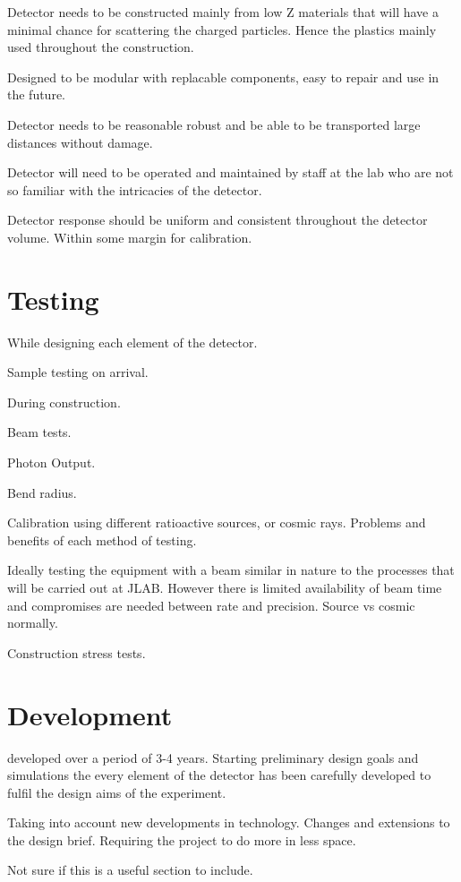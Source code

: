 Detector needs to be constructed mainly from low Z materials that will have a minimal chance for scattering the charged particles. Hence the plastics mainly used throughout the construction.

Designed to be modular with replacable components, easy to repair and use in the future.

Detector needs to be reasonable robust and be able to be transported large distances without damage.

Detector will need to be operated and maintained by staff at the lab who are not so familiar with the intricacies of the detector.

Detector response should be uniform and consistent throughout the detector volume. Within some margin for calibration.
\section{Testing}
While designing each element of the detector.

Sample testing on arrival.

During construction.

Beam tests.

Photon Output.

Bend radius.

Calibration using different ratioactive sources, or cosmic rays. Problems and benefits of each method of testing.

Ideally testing the equipment with a beam similar in nature to the processes that will be carried out at JLAB. However there is limited availability of beam time and compromises are needed between rate and precision. Source vs cosmic normally.

Construction stress tests.
\section{Development}
developed over a period of 3-4 years. Starting preliminary design goals and simulations the every element of the detector has been carefully developed to fulfil the design aims of the experiment.

Taking into account new developments in technology.
Changes and extensions to the design brief. Requiring the project to do more in less space.

Not sure if this is a useful section to include. 